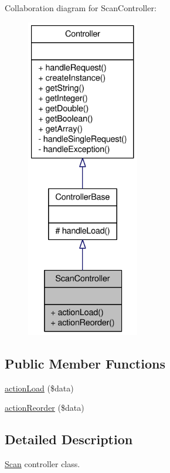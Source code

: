 Collaboration diagram for ScanController:\nopagebreak
\begin{figure}[H]
\begin{center}
\leavevmode
\includegraphics[height=400pt]{classScanController__coll__graph}
\end{center}
\end{figure}
\subsection*{Public Member Functions}
\begin{DoxyCompactItemize}
\item 
\hyperlink{classScanController_a5df6553a577a96b4afb65dd2f52464e9}{actionLoad} (\$data)
\item 
\hyperlink{classScanController_a5e4ead751c616143ac51fd6dff807c24}{actionReorder} (\$data)
\end{DoxyCompactItemize}


\subsection{Detailed Description}
\hyperlink{classScan}{Scan} controller class. 

